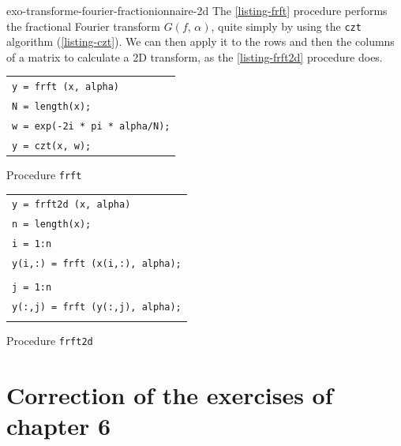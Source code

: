  
\begin{correction}{exo-transforme-fourier-fractionionnaire-2d}
The \Matlab{} \ref{listing-frft} procedure performs the fractional Fourier transform $ G (f, \, \alpha) $, quite simply by using the \texttt{czt} algorithm (\ref{listing-czt}). We can then apply it to the rows and then the columns of a matrix to calculate a 2D transform, as the \ref{listing-frft2d} procedure does.

\begin{listing} \begin{footnotesize}
{\upshape
\begin{tabular}{l} \texttt{\pfunction y = frft (x, alpha)} \\
\texttt{N = length(x);} \\
\texttt{w = exp(-2i * pi * alpha/N);} \\
\texttt{y = czt(x, w);} \\
\end{tabular}
} 
\end{footnotesize}
\caption{Procedure \texttt{\upshape frft}}
\label{listing-frft}
\end{listing}
 
\begin{listing} \begin{footnotesize}
{\upshape
\begin{tabular}{l} \texttt{\pfunction y = frft2d (x, alpha)} \\
\texttt{n = length(x);} \\
\texttt{\pfor i = 1:n} \\
\quad \texttt{y(i,:) = frft (x(i,:), alpha);} \\
\texttt{\pend} \\
\texttt{\pfor j = 1:n} \\
\quad \texttt{y(:,j) = frft (y(:,j), alpha);} \\
\texttt{\pend} \\
\end{tabular}
}
\end{footnotesize}
\caption{Procedure \texttt{\upshape frft2d}}
\label{listing-frft2d}
\end{listing}
\end{correction}

\section{Correction of the exercises of chapter 6}
 
